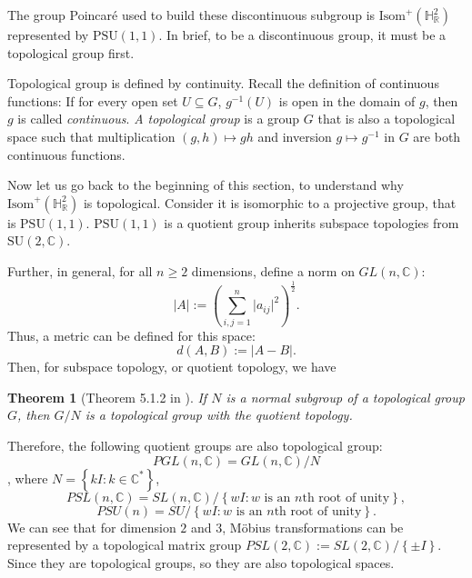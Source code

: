 \documentclass[12pt,oneside]{sfsuthesis}
\theoremstyle{plain} %
\newtheorem{theorem}{Theorem}[chapter]
\theoremstyle{definition}  %
\theoremstyle{remark}  %
\theoremstyle{plain}
\begin{document}
{The group Poincar\'{e} used to build these discontinuous subgroup is $\text{Isom}^+(\mathbb{H}^2_\mathbb{R})$ represented by $\text{PSU}(1,1)$. In brief, to be a discontinuous group, it must be a topological group first. 

Topological group is defined by continuity. Recall the definition of continuous functions: If for every open set $U\subseteq G$, $g^{-1}(U)$ is open in the domain of $g$, then $g$ is called \textit{continuous}. \textit{A topological group} is a group $G$ that is also a topological space such that multiplication $(g,h)\mapsto gh$ and inversion $g\mapsto g^{-1}$ in $G$ are both continuous functions. 

Now let us go back to the beginning of this section, to understand why $\text{Isom}^+(\mathbb{H}^2_\mathbb{R})$ is topological. Consider it is isomorphic to a projective group, that is $\text{PSU}(1,1)$. $\text{PSU}(1,1)$ is a quotient group inherits subspace topologies from $\text{SU}(2,\mathbb{C})$.%

Further, in general, for all $n\geq 2$ dimensions, define a norm on $GL(n,\mathbb{C})$:
$$
\left\vert A \right\vert := \left( \sum\limits_{i,j=1}^n \vert a_{ij}\vert^2 \right)^{\frac{1}{2}}.
$$
Thus, a metric can be defined for this space: $$
d(A,B):=\vert A -B \vert.
$$
Then, for subspace topology, or quotient topology, we have
\begin{theorem}[Theorem 5.1.2 in \cite{ratcliffe1994foundations}]
If $N$ is a normal subgroup of a topological group $G$, then $G/N$ is a topological group with the quotient topology.
\end{theorem}
Therefore, the following quotient groups are also topological group: $$PGL(n, \mathbb{C})=GL(n,\mathbb{C})/N$$, where $N=\left\lbrace kI: k\in\mathbb{C}^{\ast}\right\rbrace$, $$PSL(n, \mathbb{C})=SL(n,\mathbb{C})/\left\lbrace wI: w\text{ is an }n\text{th root of unity}\right\rbrace,$$ $$PSU(n)=SU/\left\lbrace wI: w\text{ is an }n\text{th root of unity}\right\rbrace.$$ We can see that for dimension $2$ and $3$, M\"{o}bius transformations can be represented by a topological matrix group $
PSL(2,\mathbb{C}):=SL(2,\mathbb{C})/\left\lbrace \pm I\right\rbrace.$ Since they are topological groups, so they are also topological spaces.

}
\end{document}
